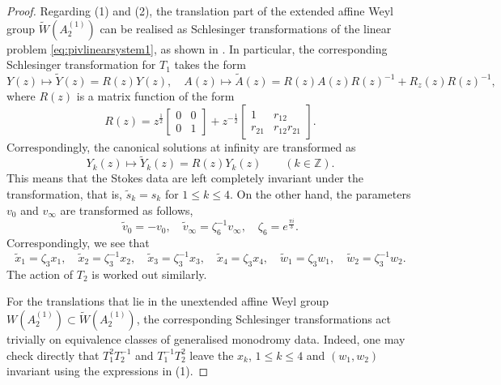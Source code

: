 \documentclass[a4paper,reqno]{amsart}
\numberwithin{equation}{section}
\numberwithin{equation}{section}
\begin{document}
\begin{proof}
Regarding (1) and (2), the translation part of the extended affine Weyl group $\widetilde{W}(A_2^{(1)})$ can be realised as Schlesinger transformations of the linear problem \eqref{eq:pivlinearsystem1}, as shown in \cite{fokasmugan1988}. In particular, the corresponding Schlesinger transformation for $T_1$ takes the form
\begin{equation*}
    Y(z)\mapsto \widetilde{Y}(z)=R(z)Y(z),\quad A(z)\mapsto \widetilde{A}(z)=R(z)A(z)R(z)^{-1}+R_z(z)R(z)^{-1},
\end{equation*}
where $R(z)$ is a matrix function of the form
\begin{equation*}
    R(z)=z^{\frac{1}{2}}\begin{bmatrix}
        0 & 0\\
        0 & 1
    \end{bmatrix}+z^{-\frac{1}{2}}\begin{bmatrix}
        1 & r_{12}\\
        r_{21} & r_{12}r_{21}
    \end{bmatrix}.
\end{equation*}
Correspondingly, the canonical solutions at infinity are transformed as
\begin{equation*}
    Y_k(z)\mapsto \widetilde{Y}_k(z)=R(z)Y_k(z)\qquad (k\in\mathbb{Z}).
\end{equation*}
This means that the Stokes data are left completely invariant under the transformation, that is, $\tilde{s}_k=s_k$ for $1\leq k\leq 4$. On the other hand, the parameters $v_0$ and $v_\infty$ are transformed as follows,
\begin{equation*}
    \tilde{v}_0=-v_0,\quad \tilde{v}_\infty=\zeta_6^{-1}v_\infty,\quad \zeta_6=e^{\frac{\pi i}{3}}.
\end{equation*}
Correspondingly, we see that
\begin{equation*}
    \widetilde{x}_1=\zeta_3x_1,\quad \widetilde{x}_2=\zeta_3^{-1}x_2,\quad 
     \widetilde{x}_3=\zeta_3^{-1}x_3,\quad \widetilde{x}_4=\zeta_3x_4,\quad \widetilde{w}_1=\zeta_3w_1,\quad \widetilde{w}_2=\zeta_3^{-1}w_2.
\end{equation*}
The action of $T_2$ is worked out similarly.

For the translations that lie in the unextended affine Weyl group $W(A_2^{(1)})\subset \widetilde{W}(A_2^{(1)})$, the corresponding Schlesinger transformations act trivially on equivalence classes of generalised monodromy data. Indeed, one may check directly that $T_1^2T_2^{-1}$ and $T_1^{-1}T_2^2$ leave the $x_k$, $1\leq k\leq 4$ and $(w_1,w_2)$ invariant using the expressions in (1).


\end{proof}
\end{document}

